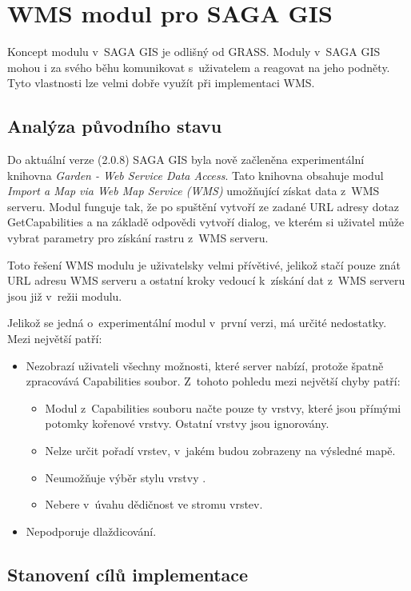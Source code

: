 \documentclass[a4paper,12pt]{article}
\begin{document}
\newpage

\section{ WMS modul pro SAGA GIS}

Koncept modulu v~SAGA GIS je odlišný od GRASS. Moduly v~SAGA GIS
mohou i za svého běhu komunikovat s~uživatelem a reagovat na jeho 
podněty. Tyto vlastnosti lze velmi dobře využít při implementaci
 WMS.


\subsection{Analýza původního stavu}

Do aktuální verze (2.0.8) SAGA GIS byla nově začleněna experimentální
knihovna \emph{Garden - Web Service Data Access}. Tato knihovna obsahuje
modul \emph{Import a Map via Web Map Service (WMS)} umožňující získat
data z~WMS serveru.  Modul funguje tak, že po spuštění vytvoří ze
zadané URL adresy dotaz GetCapabilities a na základě odpovědi vytvoří
dialog, ve kterém si uživatel může vybrat parametry pro získání rastru
z~WMS serveru.

Toto řešení WMS modulu je uživatelsky velmi přívětivé, jelikož
 stačí pouze znát URL adresu WMS serveru a ostatní kroky 
 vedoucí k~získání dat z~WMS serveru jsou již v~režii modulu.


Jelikož se jedná o~experimentální modul v~první verzi, má určité
nedostatky. Mezi největší patří:
\begin{itemize}
\item Nezobrazí uživateli všechny možnosti, které server nabízí,
      protože špatně zpracovává Capabilities soubor. Z~tohoto 
      pohledu mezi největší chyby patří: 
\begin{itemize}
 \item Modul z~Capabilities souboru načte pouze ty vrstvy, které jsou
   přímými potomky kořenové vrstvy. Ostatní vrstvy jsou ignorovány.
 \item Nelze určit pořadí vrstev, v~jakém budou zobrazeny na výsledné
   mapě.
 \item Neumožňuje výběr stylu vrstvy .
 \item Nebere v~úvahu dědičnost ve stromu vrstev.
\end{itemize}
\item Nepodporuje dlaždicování.
\end{itemize}

\subsection{Stanovení cílů implementace}
\end{document}
